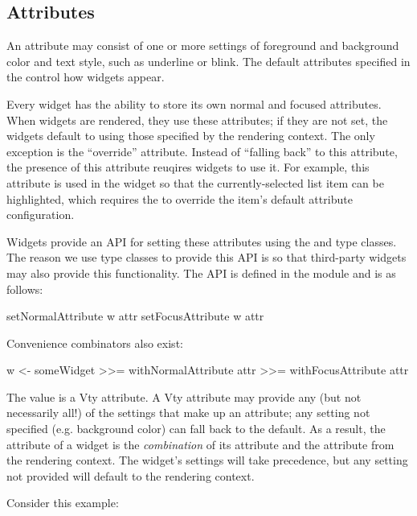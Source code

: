 \subsection{Attributes}
\label{sec:attributes}

An attribute may consist of one or more settings of foreground and
background color and text style, such as underline or blink.  The
default attributes specified in the  control how
widgets appear.

Every widget has the ability to store its own normal and focused
attributes.  When widgets are rendered, they use these attributes; if
they are not set, the widgets default to using those specified by the
rendering context.  The only exception is the ``override'' attribute.
Instead of ``falling back'' to this attribute, the presence of this
attribute reuqires widgets to use it.  For example, this attribute is
used in the  widget so that the currently-selected list item
can be highlighted, which requires the  to override the
item's default attribute configuration.

Widgets provide an API for setting these attributes using the
 and  type classes.  The
reason we use type classes to provide this API is so that third-party
widgets may also provide this functionality.  The API is defined in
the  module and is as follows:

\begin{haskellcode}
 setNormalAttribute w attr
 setFocusAttribute w attr
\end{haskellcode}

Convenience combinators also exist:

\begin{haskellcode}
 w <- someWidget
      >>= withNormalAttribute attr
      >>= withFocusAttribute attr
\end{haskellcode}

The  value is a Vty attribute.  A Vty attribute may provide
any (but not necessarily all!) of the settings that make up an
attribute; any setting not specified (e.g. background color) can fall
back to the default.  As a result, the attribute of a widget is the
\textit{combination} of its attribute and the attribute from the
rendering context.  The widget's settings will take precedence, but
any setting not provided will default to the rendering context.

Consider this example:


